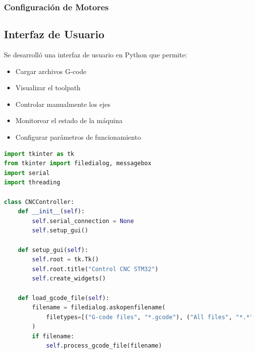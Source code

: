 \documentclass[12pt]{article}
\begin{document}
    

\subsubsection{Configuración de Motores}




\subsection{Interfaz de Usuario}

Se desarrolló una interfaz de usuario en Python que permite:

\begin{itemize}
    \item Cargar archivos G-code
    \item Visualizar el toolpath
    \item Controlar manualmente los ejes
    \item Monitorear el estado de la máquina
    \item Configurar parámetros de funcionamiento
\end{itemize}

\begin{lstlisting}[language=Python, caption={Código principal de la interfaz}]
import tkinter as tk
from tkinter import filedialog, messagebox
import serial
import threading

class CNCController:
    def __init__(self):
        self.serial_connection = None
        self.setup_gui()
    
    def setup_gui(self):
        self.root = tk.Tk()
        self.root.title("Control CNC STM32")
        self.create_widgets()
    
    def load_gcode_file(self):
        filename = filedialog.askopenfilename(
            filetypes=[("G-code files", "*.gcode"), ("All files", "*.*")]
        )
        if filename:
            self.process_gcode_file(filename)
\end{lstlisting}
\end{document}
